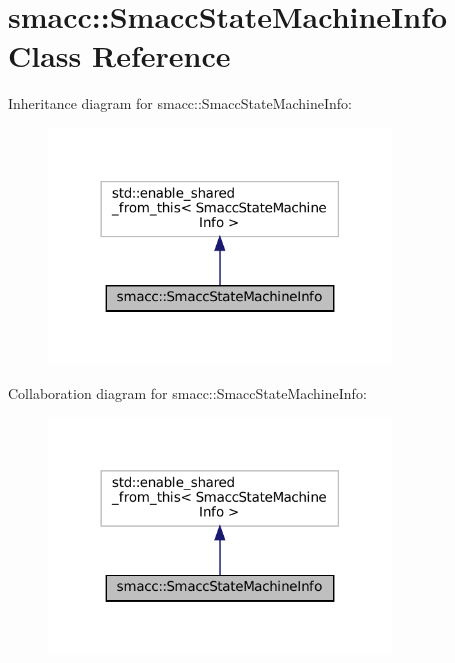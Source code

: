 \hypertarget{classsmacc_1_1SmaccStateMachineInfo}{}\section{smacc\+:\+:Smacc\+State\+Machine\+Info Class Reference}
\label{classsmacc_1_1SmaccStateMachineInfo}


Inheritance diagram for smacc\+:\+:Smacc\+State\+Machine\+Info\+:
\nopagebreak
\begin{figure}[H]
\begin{center}
\leavevmode
\includegraphics[width=258pt]{classsmacc_1_1SmaccStateMachineInfo__inherit__graph}
\end{center}
\end{figure}


Collaboration diagram for smacc\+:\+:Smacc\+State\+Machine\+Info\+:
\nopagebreak
\begin{figure}[H]
\begin{center}
\leavevmode
\includegraphics[width=258pt]{classsmacc_1_1SmaccStateMachineInfo__coll__graph}
\end{center}
\end{figure}
